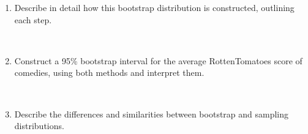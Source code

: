 \documentclass[12pt]{article}
\newcommand{\soln}[2]{$\:$\\ \vspace{#1}}{}
\begin{document}
\begin{enumerate}

\item Describe in detail how this bootstrap distribution is constructed, outlining each step.

\soln{5cm}{
\begin{enumerate}
\item Take a random sample of size 54, with replacement, from the original sample.
\item Find the mean of this sample, and record it.
\item Repeat steps 1 and 2 200 times.
\end{enumerate}
}

\pagebreak

\item Construct a 95\% bootstrap interval for the average RottenTomatoes score of comedies, using both 
methods and interpret them.

\soln{7cm}{
Percentile: Count 5 dots from each end -- roughly (49 - 56.8) \\
SE: $52.52 \pm 2.01 \times 1.98 \approx (48.5, 56.5)$ \\
We are 95\% confident that the average RT score of comedies is in these intervals.
}

\item Describe the differences and similarities between bootstrap and sampling distributions.

\soln{5cm}{
Similarity: Sample with replacement, sample size equal to original sample size. \\
Difference: Sampling dist constructed sampling from the pop, boot dist constructed sampling from the sample.
}

\end{enumerate}

\end{document}
